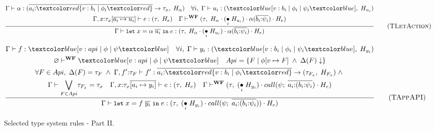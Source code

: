 \begin{figure}[h]
    \begin{equation}
        \frac{
            \begin{gathered}
                \Gamma \vdash \alpha: (\overline{a_i{:}\overa{v: b_i \;|\; \phi_i}} \rightarrow \tau_x, \;H_{\alpha}) \quad \forall i, \; \Gamma \vdash u_i : (\under{v: b_i \;|\; \phi_i \;|\; \psi_i}, \; H_{u_i}) \\
                \Gamma, x{:}\tau_x[\overline{a_i \mapsto u_i}] \vdash e : (\tau, \; H_e) \quad \Gamma \vdash^{\textbf{WF}} (\tau, \;H_\alpha \cdot ( \underset{i}{\bullet} \; H_{u_i} ) \cdot \alpha(\overline{b_i{:}\psi_i}) \cdot H_e)
            \end{gathered}
        }{
            \Gamma \vdash \texttt{\small{let}}\;x = \alpha \; \overline{u_i}\;\texttt{\small{in}}\;e : (\tau, \; H_\alpha \cdot ( \underset{i}{\bullet} \; H_{u_i} ) \cdot \alpha(\overline{b_i{:}\psi_i}) \cdot H_e)
        }
        \tag{\textsc{TLetAction}}
        \label{eq:tletaction}
    \end{equation}
    
    \begin{equation}
        \frac{
            \begin{gathered}
                \Gamma \vdash f: \under{v: api \;|\; \phi \;|\; \psi} \quad \forall i, \; \Gamma \vdash y_i: (\under{v: b_i \;|\; \phi_i \;|\; \psi_i}, \; H_{y_i}) \\ \varnothing \vdash^{\textbf{WF}} \under{v: api \;|\; \phi \;|\; \psi} \quad Api = \{F \;|\; \phi[v \mapsto F] \;\land\; \Delta(F)\downarrow\} \\
                \forall F \in Api, \; \Delta(F) = \tau_F \;\land\; \Gamma, f'{:}\tau_F \vdash f': \overline{a_i{:}\overa{v: b_i \;|\; \phi_i}} \rightarrow (\tau_{F_x}, \; H_{F_x}) \;\land\; \\
                \Gamma \vdash \underset{F \in Api}{\bigvee} \tau_{F_x} = \tau_x \quad \Gamma, x{:}\tau_x\overline{[a_i \mapsto y_i]} \vdash e : (\tau, \; H_e) \quad \Gamma \vdash^{\textbf{WF}} (\tau, \; ( \underset{i}{\bullet} \; H_{y_i} ) \cdot call(\psi; \;\overline{a_i{:}(b_i{:}\psi_i}) \cdot H_e)
            \end{gathered}
        }{
            \Gamma \vdash \texttt{\small{let}}\;x = f\;\overline{y_i}\; \texttt{\small{in}}\;e : (\tau, \; ( \underset{i}{\bullet} \; H_{y_i} ) \cdot call(\psi; \;\overline{a_i{:}(b_i{:}\psi_i})) \cdot H_e)
        }
        \tag{\textsc{TAppAPI}}
        \label{eq:tappapi}
    \end{equation}
    \caption{Selected type system rules - Part II.}
    \label{fig:type-system-2}
\end{figure}

